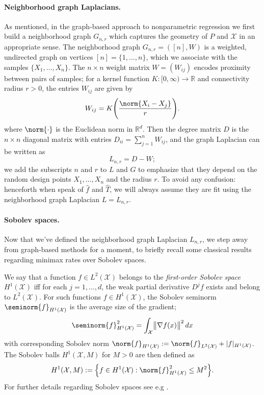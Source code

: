 \documentclass[twoside]{article}
\newcommand{\Reals}{\mathbb{R}}
\newcommand{\1}{\mathbf{1}}
\newcommand{\Rd}{\Reals^d}
\newcommand{\Lap}{L}
\newcommand{\Xset}{\mathcal{X}}
\newcommand{\Leb}{L}
\newcommand{\mc}[1]{\mathcal{#1}}
\newcommand{\wh}[1]{\widehat{#1}}
\theoremstyle{definition}
\theoremstyle{remark}
\begin{document}
\paragraph{Neighborhood graph Laplacians.}
As mentioned, in the graph-based approach to nonparametric regression we first build a neighborhood graph $G_{n,r}$ which captures the geometry of $P$ and $\mc{X}$ in an appropriate sense. The neighborhood graph $G_{n,r} = ([n],W)$ is a weighted, undirected graph on vertices $[n] = \{1,...,n\}$, which we associate with the samples $\{X_1,\ldots,X_n\}$. The $n \times n$ weight matrix $W = (W_{ij})$ encodes proximity between pairs of samples; for a kernel function $K: [0,\infty) \to \Reals$ and connectivity radius $r > 0$, the entries $W_{ij}$ are given by
\begin{equation*}
\label{eqn:neighborhood_graph}
W_{ij} = K\Biggl(\frac{\norm{X_i - X_j}}{r}\Biggr).
\end{equation*}
where $\norm{\cdot}$ is the Euclidean norm in $\Rd$. Then the degree matrix $D$ is the $n \times n$ diagonal matrix with entries $D_{ii} = \sum_{j = 1}^{n}W_{ij}$, and the graph Laplacian can be written as
\begin{equation}
\label{eqn:graph_Laplacian}
\Lap_{n,r} = D - W;
\end{equation}
we add the subscripts $n$ and $r$ to $\Lap$ and $G$ to emphasize that they depend on the random design points $X_1,\ldots,X_n$ and the radius $r$. To avoid any confusion: henceforth when speak of $\wh{f}$ and $\wh{T}$, we will always assume they are fit using the neighborhood graph Laplacian $L = L_{n,r}$. 

\paragraph{Sobolev spaces.}
Now that we've defined the neighborhood graph Laplacian $\Lap_{n,r}$, we step away from graph-based methods for a moment, to briefly recall some classical results regarding minimax rates over Sobolev spaces.

We say that a function $f \in \Leb^2(\Xset)$ belongs to the \emph{first-order Sobolev space} $H^1(\Xset)$ iff for each $j = 1,\ldots,d$, the weak partial derivative $D^jf$ exists and belong to $\Leb^2(\Xset)$. For such functions $f \in H^1(\Xset)$, the Sobolev seminorm $\seminorm{f}_{H^{1}(\Xset)}$ is the average size of the gradient;
\begin{equation*}
\seminorm{f}_{H^1(\Xset)}^2 = \int_{\Xset} \bigl\|\nabla f(x)\bigr\|^2 \,dx
\end{equation*}
with corresponding Sobolev norm $\norm{f}_{H^1(\Xset)} := \norm{f}_{\Leb^2(\Xset)} + |f|_{H^1(\Xset)}$. The Sobolev balls $H^1(\Xset,M)$ for $M > 0$ are then defined as
\begin{equation*}
H^1(\Xset,M) := \Bigl\{f \in H^1(\Xset): \norm{f}_{H^1(\Xset)}^2 \leq M^2\Bigr\}.
\end{equation*}
For further details regarding Sobolev spaces see e.g \citep{evans10, leoni2017}.
\end{document}
